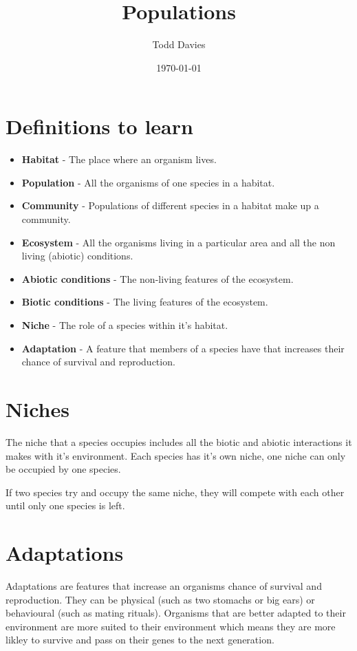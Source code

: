 \documentclass{article}
\title{Populations}
\author{Todd Davies}
\date{\today}
\begin{document}
\lhead{\today}

\maketitle

\section*{Definitions to learn}
\thispagestyle{empty}
\begin{itemize}
	\item \textbf{Habitat} - The place where an organism lives.
	\item \textbf{Population} - All the organisms of one species in a habitat.
	\item \textbf{Community} - Populations of different species in a habitat make up a community.
	\item \textbf{Ecosystem} - All the organisms living in a particular area and all the non living (abiotic) conditions.
	\item \textbf{Abiotic conditions} - The non-living features of the ecosystem.
	\item \textbf{Biotic conditions} - The living features of the ecosystem.
	\item \textbf{Niche} - The role of a species within it's habitat.
	\item \textbf{Adaptation} - A feature that members of a species have that increases their chance of survival and reproduction.
\end{itemize}

\section*{Niches}
The niche that a species occupies includes all the biotic and abiotic interactions it makes with it's environment. Each species has it's own niche, one niche can only be occupied by one species.

If two species try and occupy the same niche, they will compete with each other until only one species is left.

\section*{Adaptations}
Adaptations are features that increase an organisms chance of survival and reproduction. They can be physical (such as two stomachs or big ears) or behavioural (such as mating rituals). Organisms that are better adapted to their environment are more suited to their environment which means they are more likley to survive and pass on their genes to the next generation.
\end{document}
